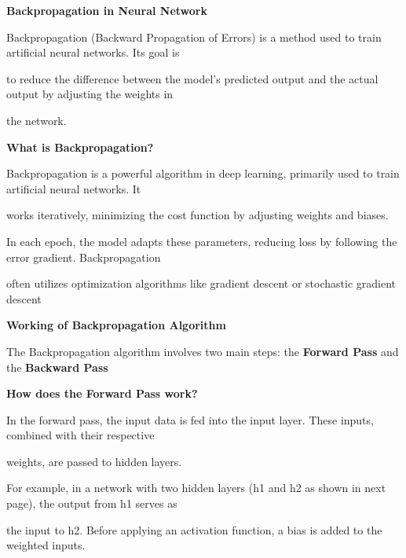 \documentclass{report}
\begin{document}
	\textbf{Backpropagation in Neural Network}
	
	\vspace{0.5cm}
	
	Backpropagation (Backward Propagation of Errors) is a method used to train artificial neural networks. Its goal is
	
	 to reduce the difference between the model's predicted output and the actual output by adjusting the weights in
	 
	  the network.
	
	\vspace{0.5cm}
	
	\textbf{What is Backpropagation?}
	
	\vspace{0.5cm}
	
	Backpropagation is a powerful algorithm in deep learning, primarily used to train artificial neural networks. It 
	
	works iteratively, minimizing the cost function by adjusting weights and biases.
	
	\vspace{0.2cm}
	
	In each epoch, the model adapts these parameters, reducing loss by following the error gradient. Backpropagation
	
	 often utilizes optimization algorithms like gradient descent or stochastic gradient descent 
	
	\vspace{0.5cm}
	
	\textbf{Working of Backpropagation Algorithm}
	
	\vspace{0.5cm}
	
	The Backpropagation algorithm involves two main steps: the \textbf{Forward Pass} and the \textbf{Backward Pass}
	
	\vspace{0.3cm}
	
	\textbf{How does the Forward Pass work?}
	
	\vspace{0.3cm}
	In the forward pass, the input data is fed into the input layer. These inputs, combined with their respective 
	
	weights, are passed to hidden layers.
	
	For example, in a network with two hidden layers (h1 and h2 as shown in next page), the output from h1 serves as
	
	 the input to h2. Before applying an activation function, a bias is added to the weighted inputs.
	
\end{document}
